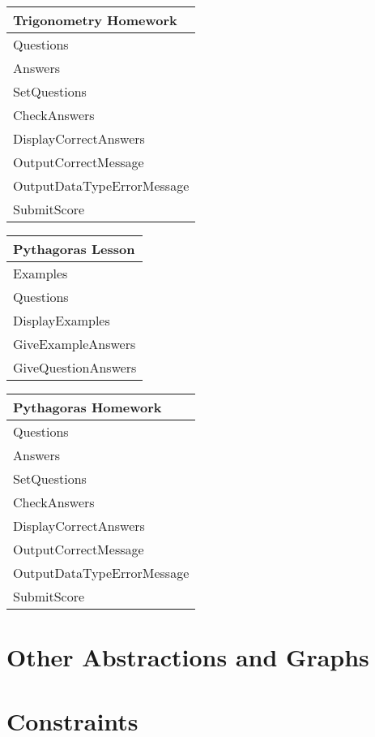 \begin{center}
\begin{tabular}{|p{5cm}|} \hline
Trigonometry Homework \\ \hline
Questions \\
Answers \\ \hline
SetQuestions \\
CheckAnswers \\
DisplayCorrectAnswers \\
OutputCorrectMessage \\
OutputDataTypeErrorMessage \\
SubmitScore \\ \hline
\end{tabular}
\end{center}

\begin{center}
\begin{tabular}{|p{5cm}|} \hline
Pythagoras Lesson \\ \hline
Examples \\
Questions \\ \hline
DisplayExamples \\
GiveExampleAnswers \\
GiveQuestionAnswers \\ \hline
\end{tabular}
\end{center}

\begin{center}
\begin{tabular}{|p{5cm}|} \hline
Pythagoras Homework \\ \hline
Questions \\
Answers \\ \hline
SetQuestions \\
CheckAnswers \\
DisplayCorrectAnswers \\
OutputCorrectMessage \\
OutputDataTypeErrorMessage \\
SubmitScore \\ \hline
\end{tabular}
\end{center}

\section{Other Abstractions and Graphs}

\section{Constraints}

